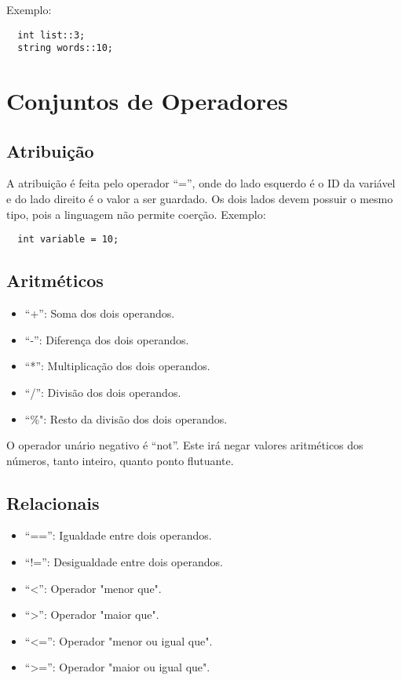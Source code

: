 \documentclass[a4paper, 12pt, article]{memoir}
\begin{document}
Exemplo:
\begin{lstlisting}
  int list::3;
  string words::10;
\end{lstlisting}

\section{Conjuntos de Operadores}
\label{sec:operadores}

\subsection{Atribuição}
\label{subsec:atribuicao}
A atribuição é feita pelo operador ``='', onde do lado esquerdo é o ID da variável e do lado direito é o valor a ser
guardado. Os dois lados devem possuir o mesmo tipo, pois a linguagem não permite coerção.
Exemplo:
\begin{lstlisting}
  int variable = 10;
\end{lstlisting}

\subsection{Aritméticos}
\label{subsec:aritmeticos}
\begin{itemize}
\item ``+'': Soma dos dois operandos.
\item ``-'': Diferença dos dois operandos.
\item ``*'': Multiplicação dos dois operandos.
\item ``/'': Divisão dos dois operandos.
\item ``\%": Resto da divisão dos dois operandos.
\end{itemize}

O operador unário negativo é ``not''. Este irá negar valores aritméticos dos
números, tanto inteiro, quanto ponto flutuante.

\subsection{Relacionais}
\label{subsec:relacionais}
\begin{itemize}
\item ``=='': Igualdade entre dois operandos.
\item ``!='': Desigualdade entre dois operandos.
\item ``\textless'': Operador "menor que".
\item ``\textgreater'': Operador "maior que".
\item ``\textless='': Operador "menor ou igual que".
\item ``\textgreater='': Operador "maior ou igual que".
\end{itemize}
\end{document}
